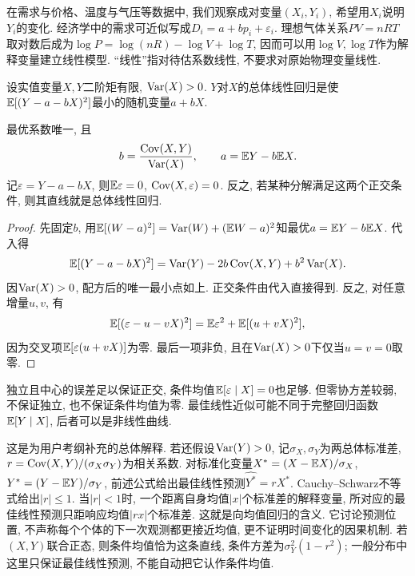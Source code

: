 在需求与价格、温度与气压等数据中, 我们观察成对变量$(X_i,Y_i)$, 希望用$X_i$说明$Y_i$的变化. 经济学中的需求可近似写成$D_i=a+bp_i+\varepsilon_i$. 理想气体关系$PV=nRT$取对数后成为$\log P=\log(nR)-\log V+\log T$, 因而可以用$\log V,\log T$作为解释变量建立线性模型. ``线性''指对待估系数线性, 不要求对原始物理变量线性.

\begin{definition}[总体线性回归]
设实值变量$X,Y$二阶矩有限, $\operatorname{Var}(X)>0$. $Y$对$X$的总体线性回归是使$\mathbb E[(Y-a-bX)^2]$最小的随机变量$a+bX$.
\end{definition}
\begin{proposition}
最优系数唯一, 且
\[
 b=\frac{\operatorname{Cov}(X,Y)}{\operatorname{Var}(X)},\qquad a=\mathbb E Y-b\mathbb E X.
\]
记$\varepsilon=Y-a-bX$, 则$\mathbb E\varepsilon=0$, $\operatorname{Cov}(X,\varepsilon)=0$. 反之, 若某种分解满足这两个正交条件, 则其直线就是总体线性回归.
\end{proposition}
\begin{proof}
先固定$b$, 用$\mathbb E[(W-a)^2]=\operatorname{Var}(W)+(\mathbb E W-a)^2$知最优$a=\mathbb E Y-b\mathbb E X$. 代入得
\[
 \mathbb E[(Y-a-bX)^2]=\operatorname{Var}(Y)-2b\operatorname{Cov}(X,Y)+b^2\operatorname{Var}(X).
\]
因$\operatorname{Var}(X)>0$, 配方后的唯一最小点如上. 正交条件由代入直接得到. 反之, 对任意增量$u,v$, 有
\[
 \mathbb E[(\varepsilon-u-vX)^2]
 =\mathbb E\varepsilon^2+\mathbb E[(u+vX)^2],
\]
因为交叉项$\mathbb E[\varepsilon(u+vX)]$为零. 最后一项非负, 且在$\operatorname{Var}(X)>0$下仅当$u=v=0$取零.
\end{proof}
独立且中心的误差足以保证正交, 条件均值$\mathbb E[\varepsilon\mid X]=0$也足够. 但零协方差较弱, 不保证独立, 也不保证条件均值为零. 最佳线性近似可能不同于完整回归函数$\mathbb E[Y\mid X]$, 后者可以是非线性曲线.

\begin{remark}[回归现象]
这是为用户考纲补充的总体解释. 若还假设$\operatorname{Var}(Y)>0$, 记$\sigma_X,\sigma_Y$为两总体标准差, $r=\operatorname{Cov}(X,Y)/(\sigma_X\sigma_Y)$为相关系数. 对标准化变量$X^*=(X-\mathbb E X)/\sigma_X$, $Y^*=(Y-\mathbb E Y)/\sigma_Y$, 前述公式给出最佳线性预测$\widehat{Y^*}=rX^*$. Cauchy--Schwarz不等式给出$|r|\leq1$. 当$|r|<1$时, 一个距离自身均值$|x|$个标准差的解释变量, 所对应的最佳线性预测只距响应均值$|rx|$个标准差. 这就是向均值回归的含义. 它讨论预测位置, 不声称每个个体的下一次观测都更接近均值, 更不证明时间变化的因果机制. 若$(X,Y)$联合正态, 则条件均值恰为这条直线, 条件方差为$\sigma_Y^2(1-r^2)$; 一般分布中这里只保证最佳线性预测, 不能自动把它认作条件均值.
\end{remark}

